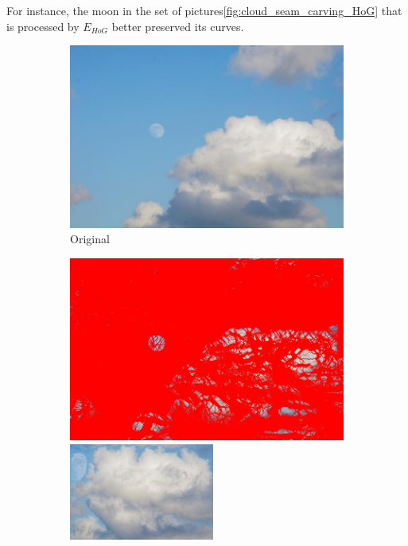 \documentclass[final]{cvpr}
\begin{document}
For instance, the moon in the set of pictures\ref{fig:cloud_seam_carving_HoG} that is processed by $E_{HoG}$ better preserved its curves.
\begin{figure}[htb]
\begin{center}
\begin{subfigure}[b]{0.768\linewidth}
    \includegraphics[width=\textwidth]{cloud.jpg}
    \caption{Original}
\end{subfigure}
\begin{subfigure}[b]{0.48\linewidth}
    \includegraphics[width=\textwidth]{cloud_seam_carving_records.jpg}
    \includegraphics[width=\textwidth]{cloud_seam_carving.jpg}

\end{subfigure}
\end{center}
\end{figure}
\end{document}
